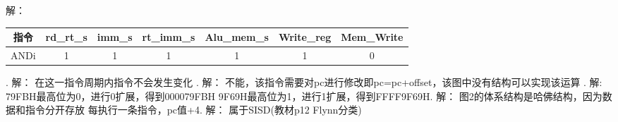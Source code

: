 解：\newline
\begin{tabular}{|c|c|c|c|c|c|c|}%
	\hline  %
	指令 & rd\_rt\_s & imm\_s & rt\_imm\_s  & Alu\_mem\_s	 & Write\_reg & Mem\_Write \\
	\hline %
	ANDi &	1 &	1 &	1 & 1 &	1 &	0 \\
	\hline
\end{tabular}. \newline
解：\newline
在这一指令周期内指令不会发生变化 . \newline
解：\newline
不能，该指令需要对pc进行修改即pc=pc+offset，该图中没有结构可以实现该运算 . \newline
解:\newline
79FBH最高位为0，进行0扩展，得到000079FBH\newline
9F69H最高位为1，进行1扩展，得到FFFF9F69H.  \newline
解：\newline
图2的体系结构是哈佛结构，因为数据和指令分开存放\newline
每执行一条指令，pc值+4. \newline
解：\newline
属于SISD(教材p12  Flynn分类)\newline